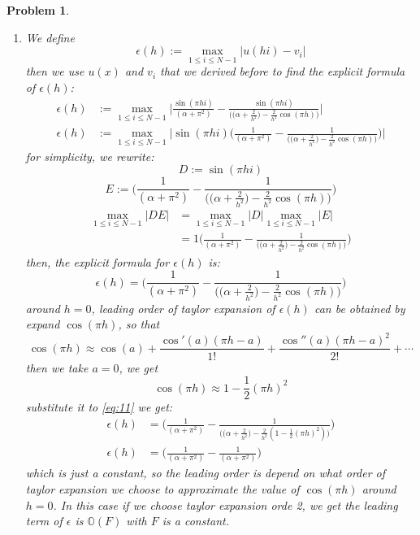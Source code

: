 \documentclass[a4paper,12pt]{article}
\newtheorem{prob}{Problem}[]
\begin{document}
\begin{prob}
\begin{enumerate}[label=(\alph*)]
		\item We define $$\epsilon(h) := \max_{1\leq i \leq N-1} |u(hi) - v_i|$$
		then we use $u(x)$ and $v_i$ that we derived before to find the explicit formula of $\epsilon(h)$:
		\begin{equation*}
		\begin{aligned}
		\epsilon(h) &:= \max_{1\leq i \leq N-1} \Biggr|\frac{\sin(\pi hi)}{(\alpha + \pi^2)} - \frac{\sin (\pi h i)}{\bigg( \bigg(\alpha + \frac{2}{h^2}\bigg) - \frac{2}{h^2} \cos (\pi h) \bigg)}\Biggr|\\
		\epsilon(h) &:= \max_{1\leq i \leq N-1} \Biggr|\sin(\pi hi) \Bigg( \frac{1}{(\alpha + \pi^2)} - \frac{1}{\bigg( \bigg(\alpha + \frac{2}{h^2}\bigg) - \frac{2}{h^2} \cos (\pi h) \bigg)} \Bigg) \Biggr|
		\end{aligned}
		\end{equation*}
		for simplicity, we rewrite:
		$$D :=\sin(\pi hi)$$
		$$E := \Bigg( \frac{1}{(\alpha + \pi^2)} - \frac{1}{\bigg( \bigg(\alpha + \frac{2}{h^2}\bigg) - \frac{2}{h^2} \cos (\pi h) \bigg)} \Bigg)$$
		\begin{equation*}
		\begin{aligned}
		\max_{1\leq i \leq N-1} \bigr|DE\bigr| &= \max_{1\leq i \leq N-1} \bigr|D\bigr| \max_{1\leq i \leq N-1} \bigr|E\bigr|\\
		& = 1 \Bigg( \frac{1}{(\alpha + \pi^2)} - \frac{1}{\bigg( \bigg(\alpha + \frac{2}{h^2}\bigg) - \frac{2}{h^2} \cos (\pi h) \bigg)} \Bigg)
		\end{aligned}
		\end{equation*}
		then, the explicit formula for $\epsilon (h)$ is:
		\begin{equation}\label{eq:11}
		\epsilon(h) = \Bigg( \frac{1}{(\alpha + \pi^2)} - \frac{1}{\bigg( \bigg(\alpha + \frac{2}{h^2}\bigg) - \frac{2}{h^2} \cos (\pi h) \bigg)} \Bigg)
		\end{equation}
		around $h=0$, leading order of taylor expansion of $\epsilon (h)$ can be obtained by expand $\cos(\pi h)$, so that
		$$\cos(\pi h) \approx \cos(a) + \frac{\cos'(a)(\pi h - a)}{1!} + \frac{\cos''(a)(\pi h - a)^2}{2!} + \cdots$$
		then we take $a=0$, we get
		$$\cos(\pi h) \approx 1-\frac{1}{2}(\pi h)^2$$
		substitute it to \eqref{eq:11} we get:
		\begin{equation*}
		\begin{aligned}
		\epsilon(h) &= \Bigg( \frac{1}{(\alpha + \pi^2)} - \frac{1}{\bigg( \bigg(\alpha + \frac{2}{h^2}\bigg) - \frac{2}{h^2} (1-\frac{1}{2}(\pi h)^2) \bigg)} \Bigg)\\
		\epsilon(h) &= \Bigg( \frac{1}{(\alpha + \pi^2)} - \frac{1}{(\alpha + \pi^2)} \Bigg)
		\end{aligned}
		\end{equation*}
		which is just a constant, so the leading order is depend on what order of taylor expansion we choose to approximate the value of $\cos(\pi h)$ around $h=0$. In this case if we choose taylor expansion orde 2, we get the leading term of $\epsilon$ is $\mathbb{O}(F)$ with $F$ is a constant.
	\end{enumerate}
\end{prob}
\end{document}
